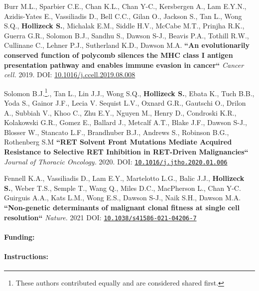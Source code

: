 {Burr M.L., Sparbier C.E., Chan K.L., Chan Y-C., Kersbergen A., Lam E.Y.N., Azidis-Yates E., Vassiliadis D., Bell C.C., Gilan O., Jackson S., Tan L., Wong S.Q., \textbf{Hollizeck S.}, Michalak E.M., Siddle H.V.,  McCabe M.T., Prinjha R.K., Guerra G.R., Solomon B.J., Sandhu S.,  Dawson S-J., Beavis P.A., Tothill R.W., Cullinane C., Lehner P.J., Sutherland K.D., Dawson M.A. \textbf{``An evolutionarily conserved function of polycomb silences the MHC class I antigen presentation pathway and enables immune evasion in cancer``} \textit{Cancer cell.} 2019. DOI: \href{https://doi.org/10.1016/j.ccell.2019.08.008}{10.1016/j.ccell.2019.08.008}

Solomon B.J.\footnote{These authors contributed equally and are considered shared first.}., Tan L.\footnotemark[\value{footnote}], Lin J.J.\footnotemark[\value{footnote}], Wong S.Q.\footnotemark[\value{footnote}], \textbf{Hollizeck S.}\footnotemark[\value{footnote}], Ebata K., Tuch B.B., Yoda S., Gainor J.F., Lecia V. Sequist L.V., Oxnard G.R., Gautschi O., Drilon A., Subbiah V., Khoo C., Zhu E.Y., Nguyen M., Henry D., Condroski K.R., Kolakowski G.R., Gomez E., Ballard J., Metcalf A.T., Blake J.F., Dawson S-J., Blosser W., Stancato L.F., Brandhuber B.J., Andrews S., Robinson B.G., Rothenberg S.M
\textbf{``RET Solvent Front Mutations Mediate Acquired Resistance to Selective RET Inhibition in RET-Driven Malignancies``}
\textit{Journal of Thoracic Oncology.} 2020. DOI: \href{https://doi.org/10.1016/j.jtho.2020.01.006}{\nolinkurl{10.1016/j.jtho.2020.01.006}}

Fennell K.A.\footnotemark[\value{footnote}], Vassiliadis D.\footnotemark[\value{footnote}], Lam E.Y., Martelotto L.G., Balic J.J., \textbf{Hollizeck S.}, Weber T.S., Semple T., Wang Q., Miles D.C., MacPherson L., Chan Y-C. Guirguis A.A., Kats L.M., Wong E.S., Dawson S-J., Naik S.H., Dawson M.A. \textbf{``Non-genetic determinants of malignant clonal fitness at single cell resolution``} \textit{Nature.} 2021 DOI: \href{https://doi.org/10.1038/s41586-021-04206-7}{\nolinkurl{10.1038/s41586-021-04206-7}}


\paragraph{Funding:}  


\hrulefill

\paragraph{Instructions:}

}
